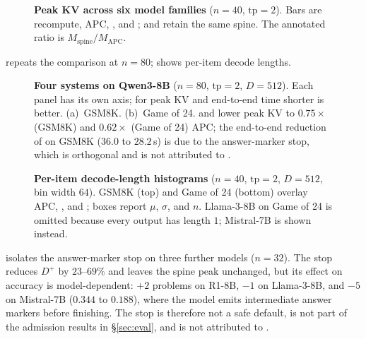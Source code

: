 \begin{figure}[t]
\centering
\resizebox{\textwidth}{!}{}
\caption{\textbf{Peak KV across six model families} ($n{=}40$, $\mathrm{tp}{=}2$).
Bars are recompute, APC, \cowonly, and \sys; \cowonly and \sys retain the same spine.
The annotated ratio is $M_{\mathrm{spine}}/M_{\mathrm{APC}}$.}
\label{fig:eval-multi}
\end{figure}

 repeats the comparison at $n{=}80$;  shows per-item decode lengths.

\begin{figure}[t]
\centering
\resizebox{\columnwidth}{!}{}
\caption{\textbf{Four systems on Qwen3-8B} ($n{=}80$, $\mathrm{tp}{=}2$, $D{=}512$).
Each panel has its own axis; for peak KV and end-to-end time shorter is better.
(a)~GSM8K. (b)~Game of 24.
\cowonly and \sys lower peak KV to $0.75\times$ (GSM8K) and $0.62\times$ (Game of 24) APC; the end-to-end reduction of \sys on GSM8K ($36.0$ to $28.2$\,s) is due to the answer-marker stop, which is orthogonal and is not attributed to \sys.}
\label{fig:eval-radar}
\end{figure}

\begin{figure}[t]
\centering
\resizebox{\textwidth}{!}{}
\caption{\textbf{Per-item decode-length histograms} ($n{=}40$, $\mathrm{tp}{=}2$, $D{=}512$, bin width $64$).
GSM8K (top) and Game of 24 (bottom) overlay APC, \cowonly, and \sys; boxes report $\mu$, $\sigma$, and $n$.
Llama-3-8B on Game of 24 is omitted because every output has length $1$; Mistral-7B is shown instead.}
\label{fig:eval-hist}
\end{figure}

 isolates the answer-marker stop on three further models ($n{=}32$).
The stop reduces $D^{+}$ by $23$--$69\%$ and leaves the spine peak unchanged, but its effect on accuracy is model-dependent: $+2$ problems on R1-8B, $-1$ on Llama-3-8B, and $-5$ on Mistral-7B ($0.344$ to $0.188$), where the model emits intermediate answer markers before finishing.
The stop is therefore not a safe default, is not part of the admission results in \S\ref{sec:eval}, and is not attributed to \sys.

